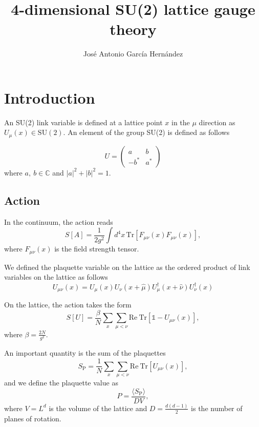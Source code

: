 \documentclass[12pt,a4paper]{article}
\author{José Antonio García Hernández}
\title{4-dimensional SU(2) lattice gauge theory}
\begin{document}
\maketitle

\section{Introduction}
An SU(2) link variable is defined at a lattice point $x$ in the $\mu$ direction as $U _{\mu}(x)\in \text{SU}(2)$. An element of the group SU(2) is defined as follows

\begin{equation}
	\label{eq:SU2_element}
	U = \begin{pmatrix}
		a & b \\
		-b^* & a^*
	\end{pmatrix}
\end{equation}
where $a, \ b \in \mathbb{C}$ and $|a|^2 + |b|^2 = 1$.

\subsection{Action}
In the continuum, the action reads
\begin{equation}
	\label{eq:continuum_action}
	S[A] = \frac{1}{2g^2} \int d^4x \, \text{Tr} \left[ F_{\mu\nu}(x)F_{\mu\nu}(x)\right],
\end{equation}
where $F_{\mu\nu}(x)$ is the field strength tensor.

We defined the plaquette variable on the lattice as the ordered product of link variables on the lattice as follows
\begin{equation}
	\label{eq:plaquette}
	U_{\mu\nu}(x) = U_{\mu}(x)U_{\nu}(x+\hat{\mu})U_{\mu}^{\dagger}(x+\hat{\nu})U_{\nu}^{\dagger}(x) 
\end{equation}


On the lattice, the action takes the form
\begin{equation}
	\label{eq:wilson_action}
	S[U] = \frac{\beta}{N}\sum_x \sum_{\mu < \nu} \text{Re}\ \text{Tr} \left[\mathds{1} - U_{\mu\nu}(x) \right],
\end{equation}
where $\beta = \frac{2N}{g^2}$.

An important quantity is the sum of the plaquettes
\begin{equation}
	\label{eq:Sp}
	S_{\text{P}} = \frac{1}{N} \sum_x\sum_{\mu < \nu} \text{Re}\ \text{Tr} [U_{\mu\nu}(x)],
\end{equation}
and we define the plaquette value as
\begin{equation}
	\label{eq:Ep}
	P =\frac{ \langle S_{\text{P}} \rangle}{D V},
\end{equation}
where $V=L^d$ is the volume of the lattice and $D = \frac{d(d-1)}{2}$ is the number of planes of rotation.
\end{document}
